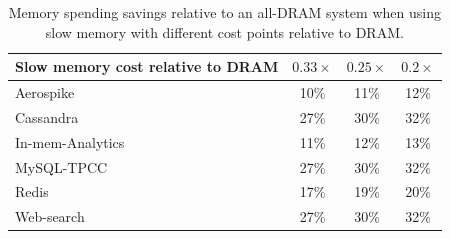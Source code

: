 \begin{table}
\begin{center}
\begin{tabular}{|p{}|c|c|c|}
\hline
Slow memory cost relative to DRAM&$0.33\times$& $0.25\times$ & $0.2\times$\\
\hline
Aerospike & 10\% & 11\% & 12\% \\
\hline
Cassandra & 27\% & 30\% & 32\% \\
\hline
In-mem-Analytics & 11\% & 12\% & 13\% \\
\hline
MySQL-TPCC & 27\% & 30\% & 32\% \\
\hline
Redis & 17\% & 19\% & 20\% \\
\hline
Web-search & 27\% & 30\% & 32\% \\
\hline
\end{tabular}
\caption{Memory spending savings relative to an all-DRAM system when using slow
memory with different cost points relative to DRAM.}
\label{tab:cost-analysis}
\end{center}
\vspace{-0.15in}
\end{table}

